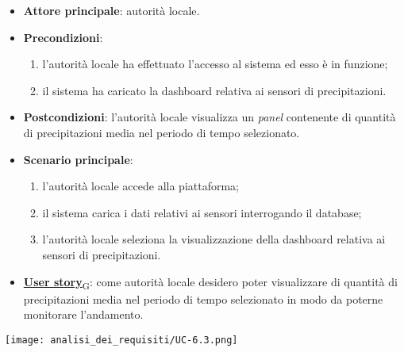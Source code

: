 \begin{itemize}
	\item \textbf{Attore principale}: autorità locale.
	\item \textbf{Precondizioni}:
	      \begin{enumerate}
		      \item l'autorità locale ha effettuato l'accesso al sistema ed esso è in funzione;
		      \item il sistema ha caricato la dashboard relativa ai sensori di precipitazioni.
	      \end{enumerate}
	\item \textbf{Postcondizioni}: l'autorità locale visualizza un \textit{panel} contenente di quantità di precipitazioni media nel periodo di tempo selezionato.
	\item \textbf{Scenario principale}:
	      \begin{enumerate}
		      \item l'autorità locale accede alla piattaforma;
		      \item il sistema carica i dati relativi ai sensori interrogando il database;
		      \item l'autorità locale seleziona la visualizzazione della dashboard relativa ai sensori di precipitazioni.
	      \end{enumerate}
	\item \href{https://7last.github.io/docs/rtb/documentazione-interna/glossario\#user-story}{\textbf{User story}\textsubscript{G}}: come autorità locale desidero poter visualizzare di quantità di precipitazioni media nel periodo di tempo selezionato
	      in modo da poterne monitorare l'andamento.
\end{itemize}
\begin{center}
	\texttt{[image: analisi\_dei\_requisiti/UC-6.3.png]}
\end{center}


